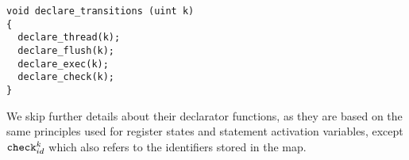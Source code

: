 \begin{lstlisting}[style=c++]
void declare_transitions (uint k)
{
  declare_thread(k);
  declare_flush(k);
  declare_exec(k);
  declare_check(k);
}
\end{lstlisting}



\noindent
We skip further details about their declarator functions, as they are based on the same principles used for register states and statement activation variables, except $\texttt{check}^k_{id}$ which also refers to the identifiers stored in the  map.

%


